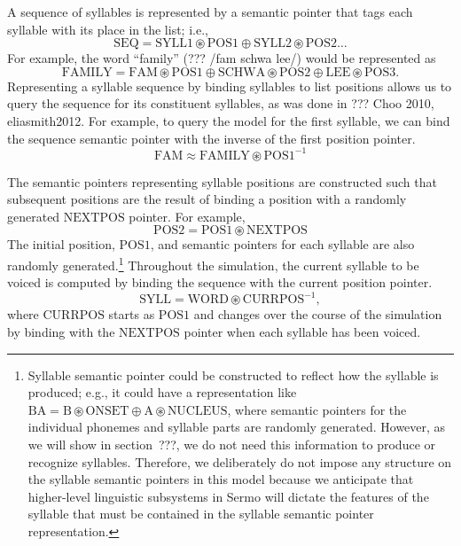 A sequence of syllables is represented
by a semantic pointer
that tags each syllable with its place
in the list; i.e.,
\begin{equation}
  \text{SEQ} = \text{SYLL1} \circledast \text{POS1} \oplus
    \text{SYLL2} \circledast \text{POS2} \ldots
\end{equation}
For example, the word ``family'' (??? /fam schwa lee/)
would be represented as
\begin{equation}
  \text{FAMILY} = \text{FAM} \circledast \text{POS1} \oplus
    \text{SCHWA} \circledast \text{POS2} \oplus
    \text{LEE} \circledast \text{POS3}.
\end{equation}
Representing a syllable sequence
by binding syllables to list positions
allows us to query the sequence
for its constituent syllables,
as was done in ??? Choo 2010, eliasmith2012.
For example, to query the model
for the first syllable,
we can bind the sequence semantic pointer
with the inverse of the first position pointer.
\begin{equation}
  \text{FAM} \approx \text{FAMILY} \circledast \text{POS1}^{-1}
\end{equation}

The semantic pointers representing syllable positions
are constructed such that subsequent positions
are the result of binding a position with
a randomly generated $\text{NEXTPOS}$ pointer.
For example,
\begin{equation}
  \label{nextpos}
  \text{POS2} = \text{POS1} \circledast \text{NEXTPOS}
\end{equation}
The initial position, $\text{POS1}$,
and semantic pointers for each syllable
are also randomly generated.\footnote{
  Syllable semantic pointer could be constructed to
  reflect how the syllable is produced; e.g.,
  it could have a representation like
  $\text{BA} = \text{B} \circledast \text{ONSET} \oplus
    \text{A} \circledast \text{NUCLEUS}$,
  where semantic pointers for the individual phonemes
  and syllable parts are randomly generated.
  However, as we will show in section~???,
  we do not need this information to
  produce or recognize syllables.
  Therefore, we deliberately do not impose
  any structure on the syllable semantic pointers
  in this model because we anticipate
  that higher-level linguistic subsystems in Sermo
  will dictate the features of the syllable
  that must be contained
  in the syllable semantic pointer representation.}
Throughout the simulation,
the current syllable to be voiced
is computed by binding the sequence
with the current position pointer.
\begin{equation}
  \text{SYLL} = \text{WORD} \circledast \text{CURRPOS}^{-1},
\end{equation}
where $\text{CURRPOS}$ starts as $\text{POS1}$
and changes over the course of the simulation
by binding with the $\text{NEXTPOS}$ pointer
when each syllable has been voiced.

